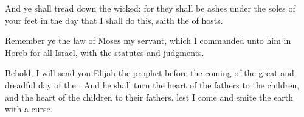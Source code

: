 \Verse And ye shall tread down the wicked; for they shall be ashes under the soles of your feet in the day that I shall do this, saith the \LORD of hosts.

\Verse Remember ye the law of Moses my servant, which I commanded unto him in Horeb for all Israel, with the statutes and judgments.

\Verse Behold, I will send you Elijah the prophet before the coming of the great and dreadful day of the \LORD: \Verse And he shall turn the heart of the fathers to the children, and the heart of the children to their fathers, lest I come and smite the earth with a curse.


